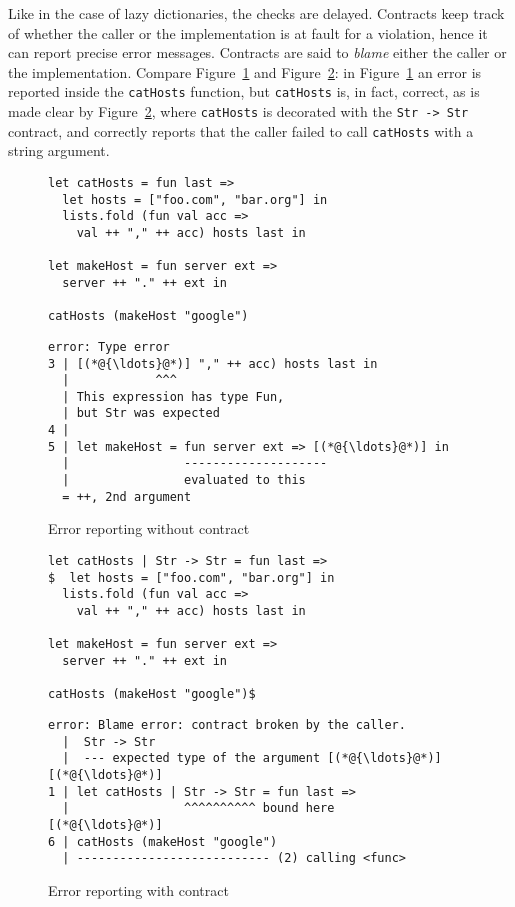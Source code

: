 \documentclass[sigplan,10pt,review,anonymous]{acmart}
\newcommand{\nickel}[1]{\lstinline[language=nickel]{#1}}
\begin{document}
Like in the case of lazy dictionaries, the checks are delayed.
Contracts keep track of whether the caller or the implementation is
at fault for a violation, hence it can report precise error
messages. Contracts are said to \emph{blame} either the caller or the
implementation. Compare Figure~\ref{fig:contract-reporting-wo} and
Figure~\ref{fig:contract-reporting-w}: in
Figure~\ref{fig:contract-reporting-wo} an error is reported inside the
\nickel{catHosts} function, but \nickel{catHosts} is, in fact,
correct, as is made clear by Figure~\ref{fig:contract-reporting-w},
where \nickel{catHosts} is decorated with the \nickel{Str -> Str}
contract, and correctly reports that the caller failed to call
\nickel{catHosts} with a string argument.

\begin{figure*}
  \centering
  \begin{subfigure}[b]{0.48\linewidth}
    \begin{lstlisting}[language=nickel]
let catHosts = fun last =>
  let hosts = ["foo.com", "bar.org"] in
  lists.fold (fun val acc =>
    val ++ "," ++ acc) hosts last in

let makeHost = fun server ext =>
  server ++ "." ++ ext in

catHosts (makeHost "google")
\end{lstlisting}

    \begin{lstlisting}[frame=none,numbers=none, basicstyle=\footnotesize\ttfamily]
error: Type error
3 | [(*@{\ldots}@*)] "," ++ acc) hosts last in
  |            ^^^
  | This expression has type Fun,
  | but Str was expected
4 |
5 | let makeHost = fun server ext => [(*@{\ldots}@*)] in
  |                --------------------
  |                evaluated to this
  = ++, 2nd argument
\end{lstlisting}
    \caption{Error reporting without contract}
    \label{fig:contract-reporting-wo}
  \end{subfigure}
  \hfill
  \begin{subfigure}[b]{0.48\linewidth}
    \begin{lstlisting}[language=nickel]
let catHosts | Str -> Str = fun last =>
$  let hosts = ["foo.com", "bar.org"] in
  lists.fold (fun val acc =>
    val ++ "," ++ acc) hosts last in

let makeHost = fun server ext =>
  server ++ "." ++ ext in

catHosts (makeHost "google")$
\end{lstlisting}
    \begin{lstlisting}[frame=none,numbers=none, basicstyle=\footnotesize\ttfamily]
error: Blame error: contract broken by the caller.
  |  Str -> Str
  |  --- expected type of the argument [(*@{\ldots}@*)]
[(*@{\ldots}@*)]
1 | let catHosts | Str -> Str = fun last =>
  |                ^^^^^^^^^^ bound here
[(*@{\ldots}@*)]
6 | catHosts (makeHost "google")
  | --------------------------- (2) calling <func>
    \end{lstlisting}
    \caption{Error reporting with contract}
    \label{fig:contract-reporting-w}
  \end{subfigure}
  \caption{Contracts improve error messages}
\end{figure*}
\end{document}

